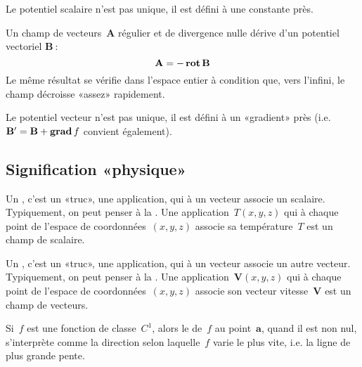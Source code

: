 Le potentiel scalaire n'est pas unique, il est défini à une constante près.

\medskip
Un champ de vecteurs~$\mathbf{A}$ régulier et de divergence nulle dérive d'un potentiel vectoriel
$\mathbf{B}~$:
\begin{equation}
  \mathbf{A} = -\operatorname{\mathbf{rot}} \mathbf{B}
\end{equation}
Le même résultat se vérifie dans l'espace entier à condition que, vers l'infini, le champ
décroisse «assez» rapidement.

Le potentiel vecteur n'est pas unique, il est défini à un «gradient» près (i.e. $ \mathbf{B} ' = \mathbf{B} + \operatorname{\mathbf{grad}} f$ convient également).

\medskip
\subsection{Signification «physique»}

Un , c'est un «truc», une application, qui à un vecteur associe un scalaire. Typiquement, on peut penser à la .
Une application~$T(x,y,z)$ qui à chaque point de l'espace de coordonnées~$(x,y,z)$ associe sa température~$T$ est un champ de scalaire.

Un , c'est un «truc», une application, qui à un vecteur associe un autre vecteur. Typiquement, on peut penser à la .
Une application~$\mathbf{V}(x,y,z)$ qui à chaque point de l'espace de coordonnées~$(x,y,z)$ associe son vecteur vitesse~$\mathbf{V}$ est un champ de vecteurs.

\medskip
Si~$f$ est une fonction de classe~$C^1$, alors le  de~$f$ au point~$\mathbf{a}$, quand il est non nul, s'interprète comme la direction selon laquelle~$f$ varie le plus vite, i.e. la ligne de plus grande pente.

